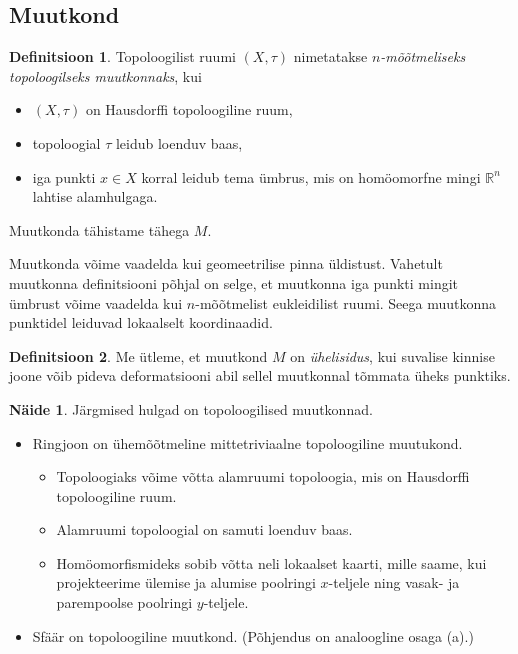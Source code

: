 \documentclass[12pt,a4paper,oneside]{article}
\theoremstyle{plain}
\theoremstyle{definition}
\newtheorem{definitsioon}{Definitsioon}[section]
\newtheorem{naide}{Näide}[section]
\numberwithin{equation}{section}
\def\R{{\mathbb R}}
\begin{document}
\newpage
\subsection{Muutkond}

\begin{definitsioon}
Topoloogilist ruumi $\left(X, \tau\right)$ nimetatakse 
\emph{$n$-mõõtmeliseks topoloogilseks muutkonnaks}, kui
\begin{itemize}
\item[1)] $\left(X, \tau\right)$ on Hausdorffi topoloogiline ruum,
\item[2)] topoloogial $\tau$ leidub loenduv baas,
\item[3)] iga punkti $x \in X$ korral leidub tema ümbrus, mis on 
	homöomorfne mingi $\R^n$ lahtise alamhulgaga.
\end{itemize}
Muutkonda tähistame tähega $M$.
\end{definitsioon}

Muutkonda võime vaadelda kui geomeetrilise pinna üldistust. 
Vahetult muutkonna definitsiooni põhjal on selge, et muutkonna 
iga punkti mingit ümbrust võime vaadelda kui $n$-mõõtmelist 
eukleidilist ruumi. Seega muutkonna punktidel leiduvad lokaalselt 
koordinaadid.

\begin{definitsioon}
Me ütleme, et muutkond $M$ on \emph{ühelisidus}, kui suvalise 
kinnise joone võib pideva deformatsiooni abil sellel muutkonnal 
tõmmata üheks punktiks.
\end{definitsioon}

\begin{naide}
Järgmised hulgad on topoloogilised muutkonnad.
\begin{itemize}
\item[(a)] Ringjoon on ühemõõtmeline mittetriviaalne topoloogiline 
muutukond.
\begin{itemize}
\item[1)] Topoloogiaks võime võtta alamruumi topoloogia, mis on 
Hausdorffi topoloogiline ruum.
\item[2)] Alamruumi topoloogial on samuti loenduv baas.
\item[3)] Homöomorfismideks sobib võtta neli lokaalset kaarti, 
mille saame, kui projekteerime ülemise ja alumise poolringi 
$x$-teljele ning vasak- ja parempoolse poolringi $y$-teljele.
\end{itemize}
\item[(b)] Sfäär on topoloogiline muutkond. (Põhjendus on 
analoogline osaga (a).)
\end{itemize}
\end{naide}
\end{document}

